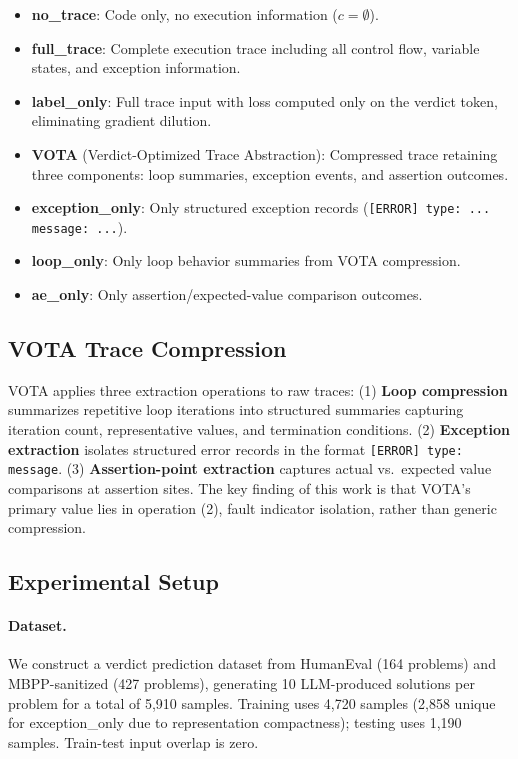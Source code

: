 \documentclass[11pt,a4paper]{article}
\begin{document}
\begin{itemize}
    \item \textbf{no\_trace}: Code only, no execution information ($c = \emptyset$).
    \item \textbf{full\_trace}: Complete execution trace including all control flow, variable states, and exception information.
    \item \textbf{label\_only}: Full trace input with loss computed only on the verdict token, eliminating gradient dilution.
    \item \textbf{VOTA} (Verdict-Optimized Trace Abstraction): Compressed trace retaining three components: loop summaries, exception events, and assertion outcomes.
    \item \textbf{exception\_only}: Only structured exception records (\texttt{[ERROR] type: ... message: ...}).
    \item \textbf{loop\_only}: Only loop behavior summaries from VOTA compression.
    \item \textbf{ae\_only}: Only assertion/expected-value comparison outcomes.
\end{itemize}

\subsection{VOTA Trace Compression}

VOTA applies three extraction operations to raw traces: (1) \textbf{Loop compression} summarizes repetitive loop iterations into structured summaries capturing iteration count, representative values, and termination conditions. (2) \textbf{Exception extraction} isolates structured error records in the format \texttt{[ERROR] type: message}. (3) \textbf{Assertion-point extraction} captures actual vs.\ expected value comparisons at assertion sites. The key finding of this work is that VOTA's primary value lies in operation (2), fault indicator isolation, rather than generic compression.

\subsection{Experimental Setup}

\paragraph{Dataset.} We construct a verdict prediction dataset from HumanEval (164 problems) and MBPP-sanitized (427 problems), generating 10 LLM-produced solutions per problem for a total of 5,910 samples. Training uses 4,720 samples (2,858 unique for exception\_only due to representation compactness); testing uses 1,190 samples. Train-test input overlap is zero.
\end{document}
